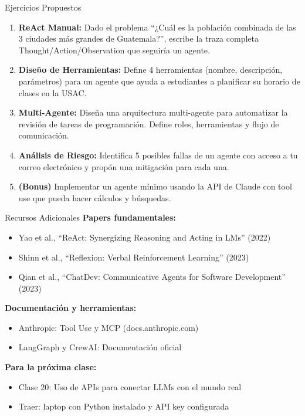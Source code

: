 \documentclass[aspectratio=169]{beamer}
\begin{document}
\begin{frame}{Ejercicios Propuestos}
    \begin{enumerate}
        \setlength\itemsep{0.5em}
        \item \textbf{ReAct Manual:} Dado el problema ``¿Cuál es la población combinada de las 3 ciudades más grandes de Guatemala?'', escribe la traza completa Thought/Action/Observation que seguiría un agente.
        
        \item \textbf{Diseño de Herramientas:} Define 4 herramientas (nombre, descripción, parámetros) para un agente que ayuda a estudiantes a planificar su horario de clases en la USAC.
        
        \item \textbf{Multi-Agente:} Diseña una arquitectura multi-agente para automatizar la revisión de tareas de programación. Define roles, herramientas y flujo de comunicación.
        
        \item \textbf{Análisis de Riesgo:} Identifica 5 posibles fallas de un agente con acceso a tu correo electrónico y propón una mitigación para cada una.
        
        \item \textbf{(Bonus)} Implementar un agente mínimo usando la API de Claude con tool use que pueda hacer cálculos y búsquedas.
    \end{enumerate}
\end{frame}
\begin{frame}{Recursos Adicionales}
    \textbf{Papers fundamentales:}
    \begin{itemize}
        \item Yao et al., ``ReAct: Synergizing Reasoning and Acting in LMs'' (2022)
        \item Shinn et al., ``Reflexion: Verbal Reinforcement Learning'' (2023)
        \item Qian et al., ``ChatDev: Communicative Agents for Software Development'' (2023)
    \end{itemize}
    
    \vspace{0.3cm}
    \textbf{Documentación y herramientas:}
    \begin{itemize}
        \item Anthropic: Tool Use y MCP (docs.anthropic.com)
        \item LangGraph y CrewAI: Documentación oficial
    \end{itemize}
    
    \vspace{0.3cm}
    \textbf{Para la próxima clase:}
    \begin{itemize}
        \item Clase 20: Uso de APIs para conectar LLMs con el mundo real
        \item Traer: laptop con Python instalado y API key configurada
    \end{itemize}
\end{frame}
\end{document}
